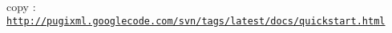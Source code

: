 copy : \href{http://pugixml.googlecode.com/svn/tags/latest/docs/quickstart.html}{\tt http://pugixml.googlecode.com/svn/tags/latest/docs/quickstart.html} 